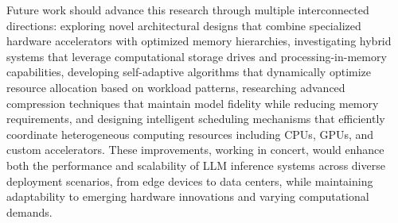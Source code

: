 Future work should advance this research through multiple interconnected directions: exploring novel architectural designs that combine specialized hardware accelerators with optimized memory hierarchies, investigating hybrid systems that leverage computational storage drives and processing-in-memory capabilities, developing self-adaptive algorithms that dynamically optimize resource allocation based on workload patterns, researching advanced compression techniques that maintain model fidelity while reducing memory requirements, and designing intelligent scheduling mechanisms that efficiently coordinate heterogeneous computing resources including CPUs, GPUs, and custom accelerators. These improvements, working in concert, would enhance both the performance and scalability of LLM inference systems across diverse deployment scenarios, from edge devices to data centers, while maintaining adaptability to emerging hardware innovations and varying computational demands.

